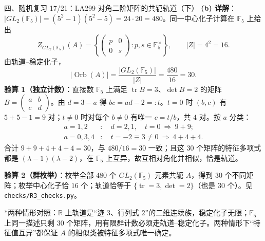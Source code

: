 \documentclass[aspectratio=169,10pt,fontset=none]{ctexbeamer}
\newcommand{\key}[1]{\textcolor{ink}{\bfseries #1}}
\newcommand{\starpt}{\textcolor{accent}{\bfseries$\ast$}}
\begin{document}
\begin{frame}[t]{四、随机复习 17/21：LA299 对角二阶矩阵的共轭轨道（下）}
\scriptsize
\key{(b) 详解}：$|GL_2(\mathbb F_5)|=(5^2-1)(5^2-5)=24\cdot20=480$。同一中心化子计算在 $\mathbb F_5$ 上给出
\[ Z_{GL_2(\mathbb F_5)}(A)=\left\{\begin{pmatrix}p&0\\0&s\end{pmatrix}:p,s\in\mathbb F_5^\times\right\},\qquad |Z|=4^2=16. \]
由轨道--稳定化子，
\[ |\operatorname{Orb}(A)|=\frac{|GL_2(\mathbb F_5)|}{|Z|}=\frac{480}{16}=30. \]
\key{验算 1（独立计数）}：直接数 $\mathbb F_5$ 上满足 $\operatorname{tr}B=3$、$\det B=2$ 的矩阵 $B=\begin{pmatrix}a&b\\c&d\end{pmatrix}$。由 $d=3-a$ 得 $bc=ad-2=:t$。$t=0$ 时 $(b,c)$ 有 $5+5-1=9$ 对；$t\neq0$ 时对每个 $b\neq0$ 有唯一 $c=t/b$，共 $4$ 对。按 $a$ 分类：
\[
\begin{aligned}
a=1,2&:\quad d=2,1,\quad t=0\ \Rightarrow\ 9+9;\\
a=0,3,4&:\quad t=-2\equiv3\neq0\ \Rightarrow\ 4+4+4.
\end{aligned}
\]
合计 $9+9+4+4+4=30$，与 $480/16=30$ 一致；且这 $30$ 个矩阵的特征多项式都是 $(\lambda-1)(\lambda-2)$，在 $\mathbb F_5$ 上互异，故互相对角化并相似，恰是轨道。

\key{验算 2（群枚举）}：枚举全部 $480$ 个 $GL_2(\mathbb F_5)$ 元素共轭 $A$，得到 $30$ 个不同矩阵；枚举中心化子恰 $16$ 个；轨道恰等于 $\{\operatorname{tr}=3,\det=2\}$（也是 $30$ 个）。见 \texttt{checks/R3\_checks.py}。

\starpt{}两种情形对照：$\mathbb R$ 上轨道是“迹 $3$、行列式 $2$”的二维连续族，稳定化子无限；$\mathbb F_5$ 上同一描述只剩 $30$ 个矩阵，用有限群计数必须走轨道--稳定化子。两种情形下“特征值互异”都保证 $A$ 的相似类被特征多项式唯一确定。
\end{frame}
\end{document}

